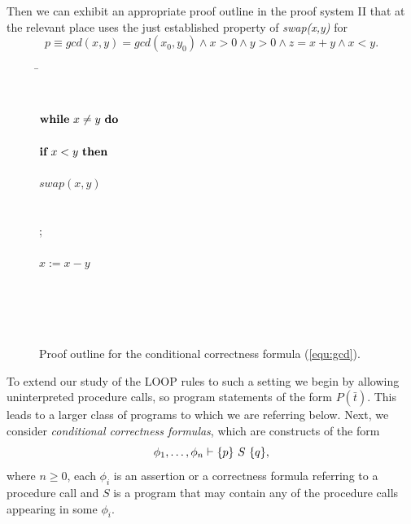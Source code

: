 \documentclass[manuscript, screen, review]{acmart}
\begin{document}
Then we can exhibit an appropriate proof outline in the proof
system II that at the relevant place uses the just established property of 
\emph{swap(x,y)} for 
\[
  p \equiv gcd(x,y)=gcd(x_0, y_0)  \wedge x>0 \wedge y>0 \wedge z = x+y \wedge x < y.
\]
 \begin{figure}[ht]
 \begin{tabbing}
 \qquad\qquad                                       
\=  \\
\>  \\
\>      \\
\> $\mbox{$\mbox{{\bf while}\ } {x \neq y}\ \mbox{{\bf do}\ }$}$                          \\
\>  \qquad {} \\
\>  \qquad $\mbox{{\bf if}\ } x < y \mbox{\ {\bf then}\ }$                         \\
\> \qquad \qquad {} \\
\>  \qquad \qquad  $swap(x,y) $                         \\
\> \qquad \qquad {} \\
\> \qquad \qquad {} \\
\>  \qquad \FI; \\
\>  \qquad {} \\
\>  \qquad $x:= x-y$                         \\
\>  \qquad {} \\
\>  \OD                                      \\
\>  \\
\>  \\
\>  
\end{tabbing}
\caption{Proof outline for the conditional correctness formula (\ref{equ:gcd}).}
\label{fig:gcd}

\end{figure}

To extend our study of the LOOP rules to such a setting we
begin by allowing uninterpreted procedure calls, so program statements
of the form $P(\bar{t})$. This leads to a larger class of programs to
which we are referring below. Next, we consider \emph{conditional
  correctness formulas}, which are constructs of the form
\[
\phi_1, \dots, \phi_n \vdash \mbox{$\{{p}\}\ {S}\ \{{q}\}$},
\]
where $n \geq 0$, each $\phi_i$ is an assertion or a correctness
formula referring to a procedure call and $S$ is a program that may
contain any of the procedure calls appearing in some $\phi_i$.
\end{document}
